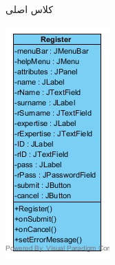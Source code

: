 \begin{figure}[H]
\begin{subfigure}[b]{0.3\textwidth}
		\caption{کلاس اصلی}
	\end{subfigure}
	\begin{subfigure}[b]{0.3\textwidth}
		\includegraphics[width=\textwidth]{img/class-design/ui/Register.png}

\end{subfigure}
\end{figure}
